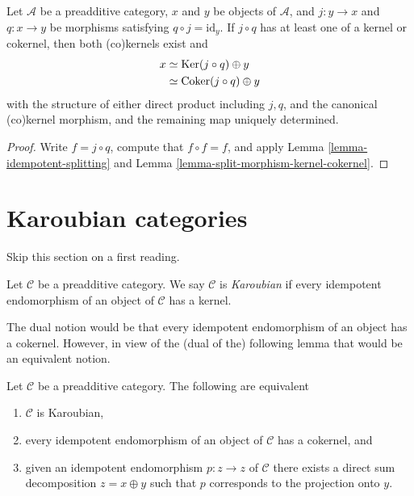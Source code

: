 \begin{lemma}
\label{lemma-split-morphism-splitting}
Let $\mathcal{A}$ be a preadditive category,
$x$ and $y$ be objects of $\mathcal{A}$,
and $j : y \to x$ and $q : x \to y$ be morphisms
satisfying $q \circ j = \text{id} _ y$.
If $j \circ q$ has at least one of a kernel or cokernel,
then both (co)kernels exist and
\begin{align*}
x
& \simeq \mathop{\mathrm{Ker}} (j \circ q) \oplus y \\
& \simeq \mathop{\mathrm{Coker}} (j \circ q) \oplus y
\end{align*}
with the structure of either direct product including $j , q$,
and the canonical (co)kernel morphism,
and the remaining map uniquely determined.
\end{lemma}

\begin{proof}
Write $f = j \circ q$,
compute that $f \circ f = f$,
and apply Lemma \ref{lemma-idempotent-splitting}
and Lemma \ref{lemma-split-morphism-kernel-cokernel}.
\end{proof}




\section{Karoubian categories}
\label{section-karoubian}

\noindent
Skip this section on a first reading.

\begin{definition}
\label{definition-karoubian}
Let $\mathcal{C}$ be a preadditive category. We say $\mathcal{C}$
is {\it Karoubian} if every idempotent endomorphism of an object
of $\mathcal{C}$ has a kernel.
\end{definition}

\noindent
The dual notion would be that every idempotent endomorphism of an
object has a cokernel. However, in view of the (dual of the)
following lemma that would be an equivalent notion.

\begin{lemma}
\label{lemma-karoubian}
Let $\mathcal{C}$ be a preadditive category. The following
are equivalent
\begin{enumerate}
\item $\mathcal{C}$ is Karoubian,
\item every idempotent endomorphism of an object of $\mathcal{C}$ has a
cokernel, and
\item given an idempotent endomorphism $p : z \to z$ of $\mathcal{C}$
there exists a direct sum decomposition $z = x \oplus y$ such
that $p$ corresponds to the projection onto $y$.
\end{enumerate}
\end{lemma}

